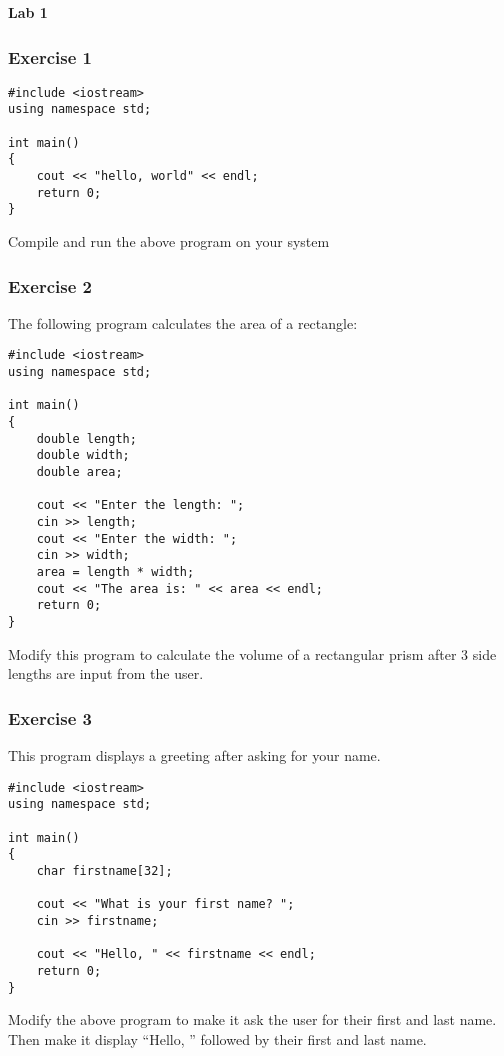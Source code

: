 \documentclass[a4paper,12pt]{article}
\begin{document}
\lstset{frame=single,basicstyle=\ttfamily,tabsize=4}

{\centering
\large \bf
Lab 1
}

\subsubsection*{Exercise 1}
\begin{lstlisting}[caption=hello.cpp]
#include <iostream>
using namespace std;

int main()
{
	cout << "hello, world" << endl;
	return 0;
}
\end{lstlisting}
Compile and run the above program on your system

\subsubsection*{Exercise 2}
The following program calculates the area of a rectangle:
\begin{lstlisting}[caption=area.cpp]
#include <iostream>
using namespace std;

int main()
{
	double length;
	double width;
	double area;

	cout << "Enter the length: ";
	cin >> length;
	cout << "Enter the width: ";
	cin >> width;
	area = length * width;
	cout << "The area is: " << area << endl;
	return 0;
}
\end{lstlisting}
Modify this program to calculate the volume of a rectangular prism after 3 side lengths are input from the user.

\subsubsection*{Exercise 3}
This program displays a greeting after asking for your name.
\begin{lstlisting}[caption=name.cpp]
#include <iostream>
using namespace std;

int main()
{
	char firstname[32];

	cout << "What is your first name? ";
	cin >> firstname;
	
	cout << "Hello, " << firstname << endl;
	return 0;
}
\end{lstlisting}
Modify the above program to make it ask the user for their first and last name. Then make it display ``Hello, '' followed by their first and last name.
\end{document}
